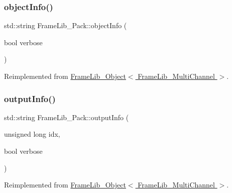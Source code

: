 \mbox{\label{class_frame_lib___pack_aa15c5f54847d99c3bd3f9c2cf7688fd2}} 
\subsubsection{\texorpdfstring{object\+Info()}{objectInfo()}}
{\footnotesize\ttfamily std\+::string Frame\+Lib\+\_\+\+Pack\+::object\+Info (\begin{DoxyParamCaption}\item[{bool}]{verbose }\end{DoxyParamCaption})\hspace{0.3cm}{\ttfamily [virtual]}}



Reimplemented from \hyperlink{class_frame_lib___object_a10d673de9a3c59ace6a22ba1cff313c8}{Frame\+Lib\+\_\+\+Object$<$ Frame\+Lib\+\_\+\+Multi\+Channel $>$}.

\mbox{\label{class_frame_lib___pack_a40e71debefbc3e5e507e4f494e9efd68}} 
\subsubsection{\texorpdfstring{output\+Info()}{outputInfo()}}
{\footnotesize\ttfamily std\+::string Frame\+Lib\+\_\+\+Pack\+::output\+Info (\begin{DoxyParamCaption}\item[{unsigned long}]{idx,  }\item[{bool}]{verbose }\end{DoxyParamCaption})\hspace{0.3cm}{\ttfamily [virtual]}}



Reimplemented from \hyperlink{class_frame_lib___object_a6e6d79e8d620eedbaa50abf324cdedf5}{Frame\+Lib\+\_\+\+Object$<$ Frame\+Lib\+\_\+\+Multi\+Channel $>$}.

\mbox{\label{class_frame_lib___pack_a59f695dc513fda6afa6bc0948c002533}} 

